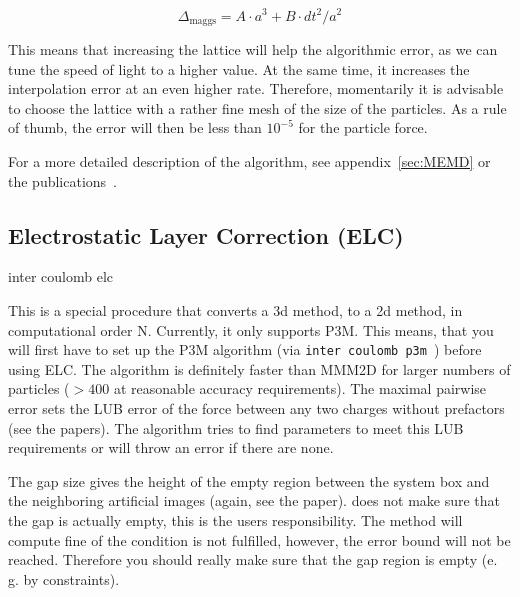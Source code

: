 \begin{equation}
\Delta_\text{maggs} = A\cdot a^3 + B\cdot dt^2/a^2
\end{equation}

This means that increasing the lattice will help the algorithmic
error, as we can tune the speed of light to a higher value. At the
same time, it increases the interpolation error at an even higher
rate. Therefore, momentarily it is advisable to choose the lattice
with a rather fine mesh of the size of the particles. As a rule of
thumb, the error will then be less than $10^{-5}$ for the particle
force.

For a more detailed description of the algorithm, see
appendix~\vref{sec:MEMD} or the publications~\cite{maggs02a,
  pasichnyk04a}.

\subsection{Electrostatic Layer Correction (ELC)}

\begin{essyntax}
  inter coulomb elc  
  \begin{features}
  \end{features}
\end{essyntax}
This is a special procedure that converts a 3d method, to a 2d method,
in computational order N. Currently, it only supports P3M. This means,
that you will first have to set up the P3M algorithm (via
\texttt{inter coulomb p3m }) before using ELC.  The
algorithm is definitely faster than MMM2D for larger numbers of
particles ($>400$ at reasonable accuracy requirements). The maximal
pairwise error  sets the LUB error of
the force between any two charges without prefactors (see the
papers). The algorithm tries to find parameters to meet this LUB
requirements or will throw an error if there are none.

The gap size  gives the height of the empty region
between the system box and the neighboring artificial images (again,
see the paper).  \es{} does not make sure that the gap is actually
empty, this is the users responsibility. The method will compute fine
of the condition is not fulfilled, however, the error bound will not
be reached. Therefore you should really make sure that the gap region
is empty (e. g. by constraints).

